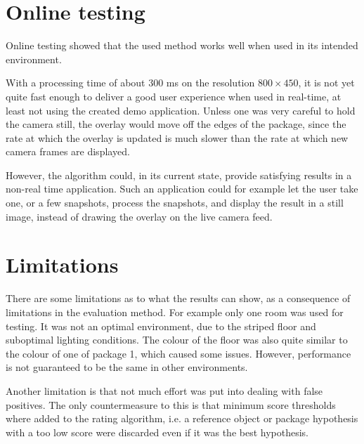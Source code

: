 
\section{Online testing} %
Online testing showed that the used method works well when used in its intended environment.

With a processing time of about 300 ms on the resolution $800 \times 450$, it is not yet quite fast enough to deliver a good user experience when used in real-time, at least not using the created demo application.
Unless one was very careful to hold the camera still, the overlay would move off the edges of the package, since the rate at which the overlay is updated is much slower than the rate at which new camera frames are displayed.

However, the algorithm could, in its current state, provide satisfying results in a non-real time application.
Such an application could for example let the user take one, or a few snapshots, process the snapshots, and display the result in a still image, instead of drawing the overlay on the live camera feed.

\section{Limitations}									
There are some limitations as to what the results can show, as a consequence of limitations in the evaluation method.
For example only one room was used for testing.
It was not an optimal environment, due to the striped floor and suboptimal lighting conditions.
The colour of the floor was also quite similar to the colour of one of package 1, which caused some issues.
However, performance is not guaranteed to be the same in other environments.

Another limitation is that not much effort was put into dealing with false positives.
The only countermeasure to this is that minimum score thresholds where added to the rating algorithm, i.e. a reference object or package hypothesis with a too low score were discarded even if it was the best hypothesis.

